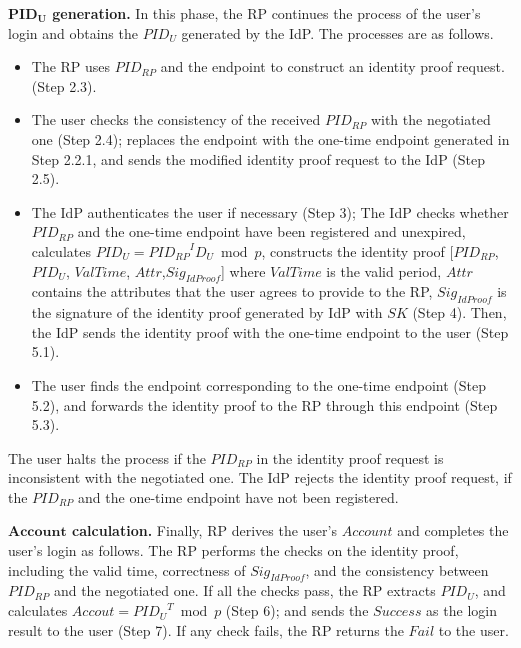 \vspace{1mm}\noindent\textbf{$\mathbf{PID_U}$ generation.}
In this phase, the RP continues the process of the user's login and obtains the $PID_U$ generated by the IdP. The processes are as follows.
\begin{itemize}
  \item The RP uses $PID_{RP}$ and the endpoint to construct an identity proof request.  %
   (Step 2.3).
  \item The user checks the consistency of the received $PID_{RP}$  with the negotiated one (Step 2.4); replaces the endpoint with the one-time endpoint generated in Step 2.2.1, and sends the modified identity proof request to the IdP (Step 2.5).
  \item The IdP authenticates the user if necessary (Step 3); 
  The IdP checks whether $PID_{RP}$ and the one-time endpoint have been registered and unexpired,
   calculates $PID_U = {PID_{RP}}^ID_U \bmod p$,  constructs the identity proof [$PID_{RP}$, $PID_U$, $ValTime$, $Attr$,$Sig_{IdProof}$] where $ValTime$ is the valid period, $Attr$ contains the  attributes that the user agrees to provide to the RP,
    $Sig_{IdProof}$ is the signature of the identity proof generated by IdP with $SK$ (Step 4). Then, the IdP sends the identity proof with the one-time endpoint to the user (Step 5.1).
  \item The user finds  the  endpoint corresponding to the one-time endpoint (Step 5.2),
   and forwards the identity proof to the RP through this endpoint (Step 5.3).
\end{itemize}
The user halts the process if the $PID_{RP}$ in the identity proof request is inconsistent with  the negotiated one.
The IdP rejects the identity proof request, if the $PID_{RP}$ and the one-time endpoint have not been registered.


\vspace{1mm}\noindent\textbf{$\mathbf{Account}$ calculation.}
Finally, RP derives the user's  $Account$ and completes the user's login as follows. The RP performs the checks on the identity proof, including the valid time, correctness of $Sig_{IdProof}$, and   the consistency between $PID_{RP}$ and the  negotiated one. If all the checks pass, the RP extracts $PID_U$, and calculates $Accout = {PID_U}^T \bmod p$ (Step 6); and sends the $Success$ as the login result to the user (Step 7). If any check fails, the RP returns the $Fail$ to the user.

